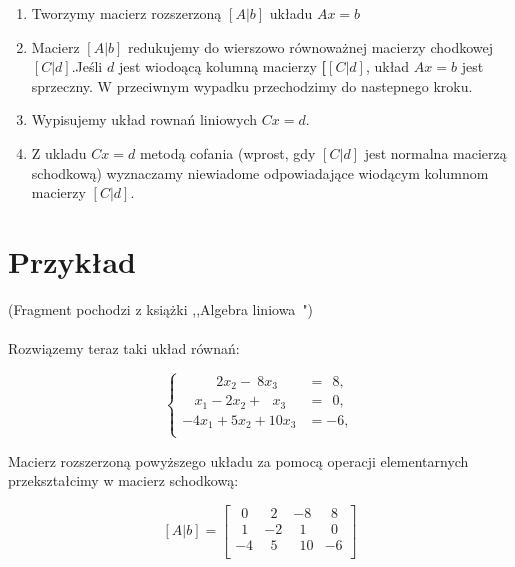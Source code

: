\documentclass[13pt, a4paper, titlepage]{article}
\begin{document}
            \begin{enumerate}

  \item Tworzymy macierz rozszerzoną \textbf{$[A|b]$} układu \textbf{$Ax = b$}
  \item Macierz \textbf{$[A|b]$} redukujemy do wierszowo równoważnej macierzy chodkowej \textbf{$[C|d]$}.Jeśli \textbf{$d$} jest wiodoącą kolumną macierzy \textbf{[$[C|d]$}, układ \textbf{$Ax = b$} jest sprzeczny. W przeciwnym wypadku przechodzimy do nastepnego kroku.
  \item Wypisujemy układ rownań liniowych \textbf{$Cx = d$}.
  \item Z ukladu \textbf{$Cx = d$} metodą cofania (wprost, gdy \textbf{$[C|d]$} jest normalna macierzą schodkową) wyznaczamy niewiadome odpowiadające wiodącym kolumnom macierzy \textbf{$[C|d].$}

            \end{enumerate}
\newpage
\section{Przykład}(Fragment pochodzi z książki ,,Algebra liniowa~\cite{topp}")
\\\\
        Rozwiązemy teraz taki układ równań:

    \begin{equation}
	\left\{	
	\begin{array}{ll}

\ \ \ \ \ \ \ \ \ \ \   2x_2 - \ 8x_3  &=\ \ 8, \\

\ \ \  \ x_1 -  2x_2 +  \ \ \ x_3  &=\ \ 0, \\
-4x_1 +  5x_2 + 10x_3  &= -6, \\
		
	\end{array} \right.
\end{equation}

Macierz rozszerzoną powyższego układu za pomocą operacji elementarnych przekształcimy w macierz schodkową:


    \[
   [A|b]=
  \left[ {\begin{array}{cccc}
   \ \ 0  &  \ \ 2    &      -8   &     \ \ 8      \\
   \ \ 1  &     -2    &  \ \ 1    &     \ \ 0      \\
       -4 &  \ \ 5    &  \ \ 10   &         -6     \\
  \end{array} } \right]
    \]
\end{document}
